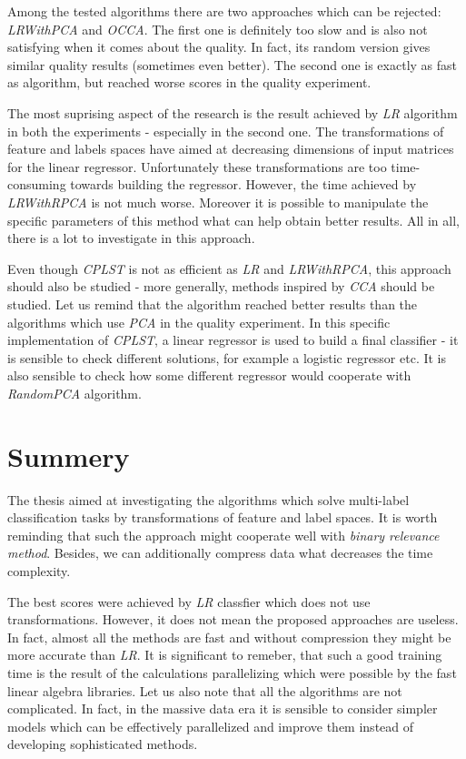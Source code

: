 Among the tested algorithms there are two approaches which can be rejected: \textit{LRWithPCA} and \textit{OCCA}. The first one is definitely too slow and is also not satisfying when it comes about the quality. In fact, its random version gives similar quality results (sometimes even better). The second one is exactly as fast as  algorithm, but reached worse scores in the quality experiment. 

The most suprising aspect of the research is the result achieved by \textit{LR} algorithm in both the experiments - especially in the second one. The transformations of feature and labels spaces have aimed at decreasing dimensions of input matrices for the linear regressor. Unfortunately these transformations are too time-consuming towards building the regressor. However, the time achieved by \textit{LRWithRPCA} is not much worse. Moreover it is possible to manipulate the specific parameters of this method what can help obtain better results. All in all, there is a lot to investigate in this approach.   

Even though \textit{CPLST} is not as efficient as \textit{LR} and \textit{LRWithRPCA}, this approach should also be studied - more generally, methods inspired by \textit{CCA} should be studied. Let us remind that the algorithm reached better results than the algorithms which use \textit{PCA} in the quality experiment. In this specific implementation of \textit{CPLST}, a linear regressor is used to build a final classifier - it is sensible to check different solutions, for example a logistic regressor etc. It is also sensible to check how some different regressor would cooperate with \textit{RandomPCA} algorithm.

\section{Summery}

The thesis aimed at investigating the algorithms which solve multi-label classification tasks by transformations of feature and label spaces. It is worth reminding that such the approach might cooperate well with \textit{binary relevance method}. Besides, we can additionally compress data what decreases the time complexity. 

The best scores were achieved by \textit{LR} classfier which does not use transformations. However, it does not mean the proposed approaches are useless. In fact, almost all the methods are fast and without compression they might be more accurate than \textit{LR}. It is significant to remeber, that such a good training time is the result of the calculations parallelizing which were possible by the fast linear algebra libraries. Let us also note that all the algorithms are not complicated. In fact, in the massive data era it is sensible to consider simpler models which can be effectively parallelized and improve them instead of developing sophisticated methods.

